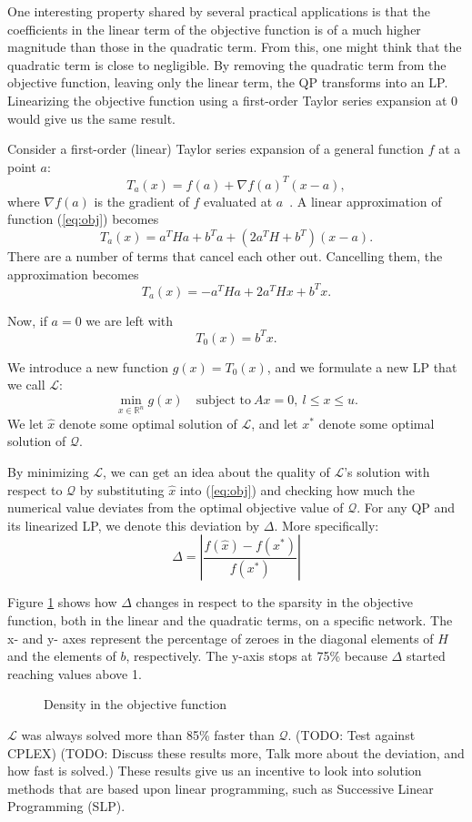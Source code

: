 One interesting property shared by several practical applications is that the
coefficients in the linear term of the objective function is of a much higher
magnitude than those in the quadratic term.
From this, one might think that the quadratic term is close to negligible.
By removing the quadratic term from the objective function, leaving only the
linear term, the QP transforms into an LP.
Linearizing the objective function using a first-order Taylor series expansion
at 0 would give us the same result.

Consider a first-order (linear) Taylor series expansion of a
general function $f$ at a point $a$:
\[
T_a(x) = f(a) + \nabla f(a)^T(x-a),
\]
where $\nabla f(a)$ is the gradient of $f$ evaluated at $a$~\cite{apostol}.
A linear approximation of function (\ref{eq:obj}) becomes
\[
T_a(x) = a^THa + b^Ta + (2a^TH + b^T)(x - a).
\]
There are a number of terms that cancel each other out. Cancelling them,
the approximation becomes
\begin{equation}
\label{eq:texp}
T_a(x) = - a^THa + 2a^THx + b^Tx.
\end{equation}

Now, if $a = 0$ we are left with
\[
T_0(x) = b^Tx.
\]

We introduce a new function $g(x) = T_0(x)$, and we formulate a new LP
that we call $\mathcal{L}$:
\[
\min_{x \in \mathbb{R}^n} g(x)
\quad \textrm{subject to}
~
Ax = 0,
~
l \le x \le u.
\]
We let $\hat{x}$ denote some optimal solution of $\mathcal{L}$, and let $x^*$
denote some optimal solution of $\mathcal{Q}$.

By minimizing $\mathcal{L}$, we can get an idea about the quality of
$\mathcal{L}$'s solution with respect to $\mathcal{Q}$ by substituting
$\hat{x}$ into (\ref{eq:obj}) and checking how much the numerical value
deviates from the optimal objective value of $\mathcal{Q}$.
For any QP and its linearized LP, we denote this deviation by $\Delta$.
More specifically:
\[
\Delta = \left|\frac{f(\hat{x}) - f(x^*)}{f(x^*)}\right|
\]

Figure \ref{fig:sparsobj} shows how $\Delta$ changes in respect to the sparsity
in the objective function, both in the linear and the quadratic terms, on a
specific network. The x- and y- axes represent the percentage of zeroes in the
diagonal elements of $H$ and the elements of $b$, respectively. The y-axis
stops at 75\% because $\Delta$ started reaching values above 1.

\begin{figure}[ht!]
\begin{center}
    
\end{center}
\caption{Density in the objective function}
\label{fig:sparsobj}
\end{figure}

$\mathcal{L}$ was always solved more than 85\% faster than $\mathcal{Q}$.
(TODO: Test against CPLEX)
(TODO: Discuss these results more, Talk more about the deviation, and how fast
is solved.)
These results give us an incentive to look into solution methods that are based
upon linear programming, such as Successive Linear Programming (SLP).
